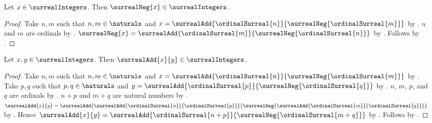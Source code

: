 \begin{theorem}\label{surreal_integer_negation_closed}
    Let $x\in\surrealIntegers$.
    Then $\surrealNeg{x}\in\surrealIntegers$.
\end{theorem}
\begin{proof}
    Take $n,m$ such that $n,m\in\naturals$ and
        $x=\surrealAdd{\ordinalSurreal{n}}
            {\surrealNeg{\ordinalSurreal{m}}}$
        by .
    $n$ and $m$ are ordinals by .
    $\surrealNeg{x}=
        \surrealAdd{\ordinalSurreal{m}}
            {\surrealNeg{\ordinalSurreal{n}}}$
        by .
    Follows by .
\end{proof}

\begin{theorem}\label{surreal_integer_addition_closed}
    Let $x,y\in\surrealIntegers$.
    Then $\surrealAdd{x}{y}\in\surrealIntegers$.
\end{theorem}
\begin{proof}
    Take $n,m$ such that $n,m\in\naturals$ and
        $x=\surrealAdd{\ordinalSurreal{n}}
            {\surrealNeg{\ordinalSurreal{m}}}$
        by .
    Take $p,q$ such that $p,q\in\naturals$ and
        $y=\surrealAdd{\ordinalSurreal{p}}
            {\surrealNeg{\ordinalSurreal{q}}}$
        by .
    $n$, $m$, $p$, and $q$ are ordinals
        by .
    $n+p$ and $m+q$ are natural numbers
        by .
    $\surrealAdd{x}{y}=
        \surrealAdd
            {\surrealAdd{\ordinalSurreal{n}}{\ordinalSurreal{p}}}
            {\surrealNeg{
                \surrealAdd{\ordinalSurreal{m}}{\ordinalSurreal{q}}}}$
        by .
    Hence $\surrealAdd{x}{y}=
        \surrealAdd{\ordinalSurreal{n+p}}
            {\surrealNeg{\ordinalSurreal{m+q}}}$
        by .
    Follows by .
\end{proof}


